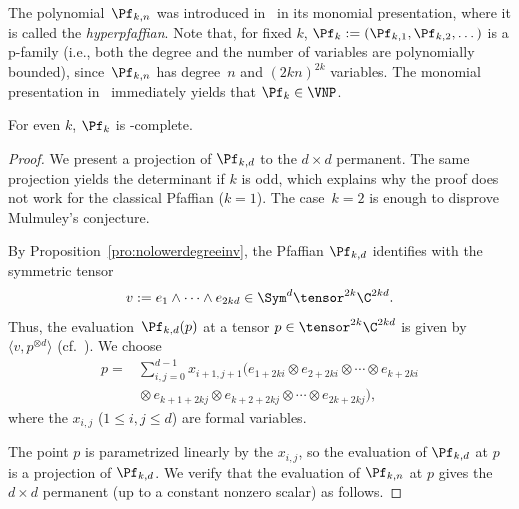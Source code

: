 \noindent
The polynomial~$\Pf_{k,n}$ was introduced in~\cite[Def.~3.4]{Bar:95} in its monomial presentation, where it is called the \emph{hyperpfaffian}.
Note that, for fixed $k$, $\Pf_k := (\Pf_{k,1},\Pf_{k,2},\dots)$ is a p-family (i.e., both the degree and the number of variables are polynomially bounded), since~$\Pf_{k,n}$ has degree~$n$ and $(2kn)^{2k}$ variables.
The monomial presentation in~\cite{Bar:95} immediately yields that $\Pf_k \in \VNP$.
\begin{theorem}
For even $k$, $\Pf_k$ is \VNP-complete.
\end{theorem}
\begin{proof}
We present a projection of $\Pf_{k,d}$ to the $d\times d$ permanent.
The same projection yields the determinant if $k$ is odd, which explains why the proof does not work for the classical Pfaffian ($k=1$).
The case~$k=2$ is enough to disprove Mulmuley's conjecture.

By Proposition~\ref{pro:nolowerdegreeinv}, the Pfaffian $\Pf_{k,d}$ identifies with the symmetric tensor
\begin{align*}
  v := e_1 \wedge \cdots \wedge e_{2kd} \in \Sym^d \tensor^{2k}\C^{2kd}.
\end{align*}
%
Thus, the evaluation~$\Pf_{k,d}(p)$ at a tensor $p \in \tensor^{2k} \C^{2kd}$ is given by $\langle v, p^{\otimes d}\rangle$ (cf.~\cite[Sec.~4.2(A)]{Ike:12}).
We choose
\[
\begin{aligned}
p ={}& \sum_{i,j=0}^{d-1} x_{i+1,j+1} (e_{1+2ki} \otimes e_{2+2ki} \otimes \cdots \otimes e_{k+2ki}\\
&{}\otimes e_{k+1+2kj} \otimes e_{k+2+2kj} \otimes \cdots \otimes e_{2k+2kj}),
\end{aligned}
\]
where the $x_{i,j}$ ($1 \leq i,j \leq d$) are formal variables.

The point $p$ is parametrized linearly by the $x_{i,j}$, so the evaluation of $\Pf_{k,d}$ at $p$ is a projection of $\Pf_{k,d}$.
We verify that the evaluation of $\Pf_{k,n}$ at $p$ gives the $d \times d$ permanent (up to a constant nonzero scalar) as follows.


\end{proof}
